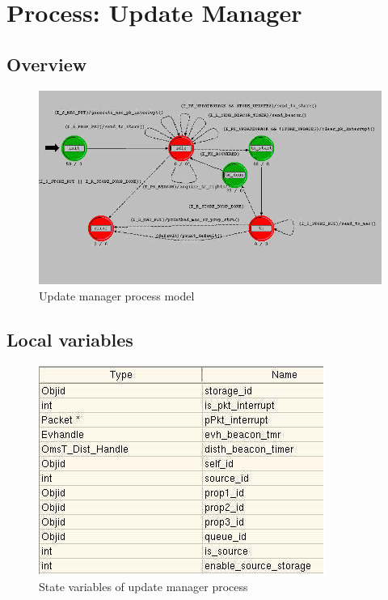 
\section{Process: Update Manager}

\subsection{Overview}
\begin{figure}[ht]
    \centering
    \includegraphics[width=.5\textwidth]{images/p_update_manager}
    \caption{Update manager process model}
    \label{fig:appendix-c}
\end{figure}

\subsection{Local variables}
\begin{figure}[ht]
    \centering
    \includegraphics[width=.7\textwidth]{images/state_variable_update_manager}
    \caption{State variables of update manager process}
    \label{fig:appendix-c_sv}
\end{figure}

